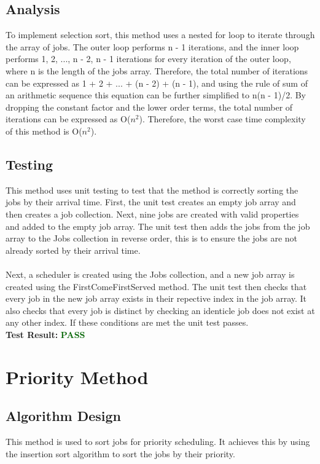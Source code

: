 \documentclass[12pt,a4paper]{article}
\begin{document}
		\subsection{Analysis}
			To implement selection sort, this method uses a nested for loop to iterate through the
			array of jobs. The outer loop performs n - 1 iterations, and the inner loop performs 
			1, 2, ..., n - 2, n - 1 iterations for every iteration of the outer loop, where n is 
			the length of the jobs array. Therefore, the total number of iterations can be expressed as 
			1 + 2 + ... + (n - 2) + (n - 1), and using the rule of sum of an arithmetic sequence 
			this equation can be further simplified to n(n - 1)/2. By dropping the constant factor and 
			the lower order terms, the total number of iterations can be expressed as O($n ^ 2$). Therefore, 
			the worst case time complexity of this method is O($n ^ 2$).\\
			
		\newpage

		\subsection{Testing}
			This method uses unit testing to test that the method is correctly sorting the jobs by 
			their arrival time. First, the unit test creates an empty job array and then creates a 
			job collection. Next, nine jobs are created with valid properties and added to the 
			empty job array. The unit test then adds the jobs from the job array to the Jobs collection 
			in reverse order, this is to ensure the jobs are not already sorted by their arrival time.\\\\
			Next, a scheduler is created using the Jobs collection, and a new job array is created 
			using the FirstComeFirstServed method. The unit test then checks that every job in the 
			new job array exists in their repective index in the job array. It also checks that every job is
			distinct by checking an identicle job does not exist at any other index. If these conditions are 
			met the unit test passes.\\

			\textbf{Test Result:} \textbf{\textcolor{darkgreen}{PASS}}\\

	\newpage
	\section{Priority Method}
		\subsection{Algorithm Design}
			This method is used to sort jobs for priority scheduling. It achieves this by using the 
			insertion sort algorithm to sort the jobs by their priority.\\
			
\end{document}

